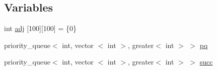 \subsection*{\-Variables}
\begin{DoxyCompactItemize}
\item 
int \hyperlink{SpherePFD_8c_09_09_a5cc29cbda633cf803a14bc73ed26a902}{adj} \mbox{[}100\mbox{]}\mbox{[}100\mbox{]} = \{0\}
\item 
priority\-\_\-queue$<$ int, vector\*
$<$ int $>$, greater$<$ int $>$ $>$ \hyperlink{SpherePFD_8c_09_09_ab6bdd514724b32f635e208c56bdafe8d}{pq}
\item 
priority\-\_\-queue$<$ int, vector\*
$<$ int $>$, greater$<$ int $>$ $>$ \hyperlink{SpherePFD_8c_09_09_a528bc05abddf40ec8ae9b5c245e7282a}{succ}
\end{DoxyCompactItemize}


